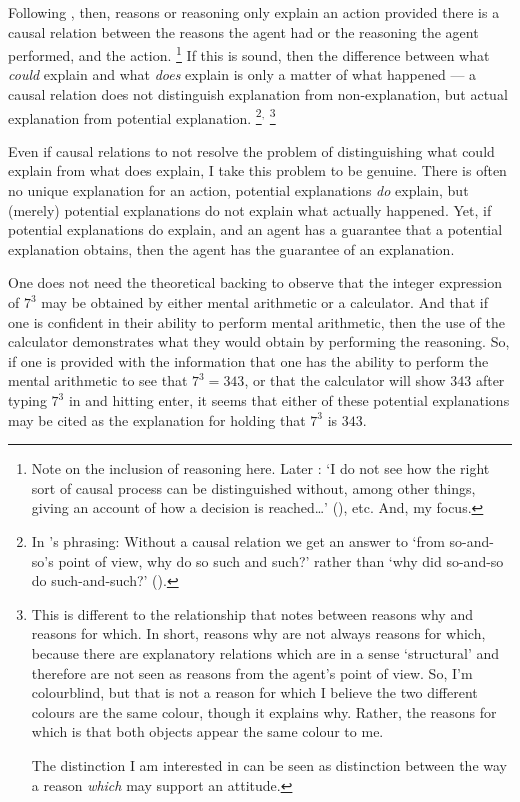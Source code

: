 \documentclass[10pt]{article}
\begin{document}
Following \citeauthor{Davidson:2001aa}, then, reasons or reasoning only explain an action provided there is a causal relation between the reasons the agent had or the reasoning the agent performed, and the action.\nolinebreak
\footnote{
  Note on the inclusion of reasoning here.
  Later \citeauthor{Davidson:2001aa}: `I do not see how the right sort of causal process can be distinguished without, among other things, giving an account of how a decision is reached\dots' (\citeyear[232]{Davidson:2001aa}), etc.
  And, my focus.
}
If this is sound, then the difference between what \emph{could} explain and what \emph{does} explain is only a matter of what happened --- a causal relation does not distinguish explanation from non-explanation, but actual explanation from potential explanation.\nolinebreak
\footnote{
  In \citeauthor{Hieronymi:2011aa}'s phrasing: Without a causal relation we get an answer to ‘from so-and-so’s point of view, why do so such and such?’ rather than ‘why did so-and-so do such-and-such?’ (\citeyear[417]{Hieronymi:2011aa}).
}\(^{,}\)\nolinebreak
\footnote{
  {
    \color{red}
    This is different to the relationship that \citeauthor{Neta:2019aa} notes between reasons why and reasons for which.
    In short, reasons why are not always reasons for which, because there are explanatory relations which are in a sense `structural' and therefore are not seen as reasons from the agent's point of view.
    So, I'm colourblind, but that is not a reason for which I believe the two different colours are the same colour, though it explains why.
    Rather, the reasons for which is that both objects appear the same colour to me.

    The distinction I am interested in can be seen as distinction between the way a reason \emph{which} may support an attitude.
  }
}

Even if causal relations to not resolve the problem of distinguishing what could explain from what does explain, I take this problem to be genuine.
There is often no unique explanation for an action, potential explanations \emph{do} explain, but (merely) potential explanations do not explain what actually happened.
Yet, if potential explanations do explain, and an agent has a guarantee that a potential explanation obtains, then the agent has the guarantee of an explanation.

One does not need the theoretical backing to observe that the integer expression of \(7^{3}\) may be obtained by either mental arithmetic or a calculator.
And that if one is confident in their ability to perform mental arithmetic, then the use of the calculator demonstrates what they would obtain by performing the reasoning.
So, if one is provided with the information that one has the ability to perform the mental arithmetic to see that \(7^{3} = 343\), or that the calculator will show \(343\) after typing \(7^{3}\) in and hitting enter, it seems that either of these potential explanations may be cited as the explanation for holding that \(7^{3}\) is \(343\).
\end{document}
